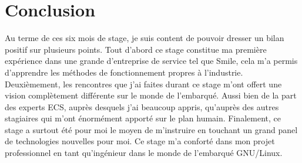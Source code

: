 \chapter*{Conclusion}
Au terme de ces six mois de stage, je suis content de pouvoir dresser un bilan positif sur plusieurs points. Tout d'abord ce stage constitue ma première expérience dans une grande  d'entreprise de service tel que Smile, cela m'a permis d'apprendre les méthodes de fonctionnement propres à l'industrie. Deuxièmement, les rencontres que j'ai faites durant ce stage m'ont offert une vision complètement différente sur le monde de l'embarqué. Aussi bien de la part des experts ECS, auprès desquels j'ai beaucoup appris, qu'auprès des autres stagiaires qui m'ont énormément apporté sur le plan humain. Finalement, ce stage a surtout été pour moi le moyen de m'instruire en touchant un grand panel de technologies nouvelles pour moi.
Ce stage m'a conforté dans mon projet professionnel en tant qu'ingénieur dans le monde de l'embarqué GNU/Linux.